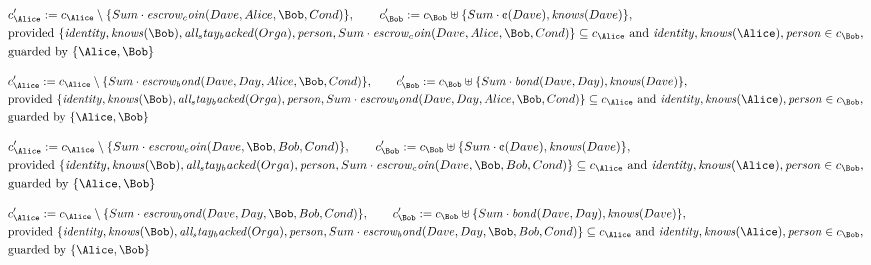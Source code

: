 \begin{align*}
&
c'_
{
\Alice
}
 := 
c_
{
\Alice
}
 \setminus 
\{
Sum
\cdot
\mathit{
escrow_coin
}
(
Dave
,
Alice
,
\Bob
,
Cond
)
\}
, \qquad 
c'_
{
\Bob
}
 := 
c_
{
\Bob
}
 \uplus 
\{
Sum
\cdot
\text{\textcent}
(
Dave
)
,
\mathit{
knows
}
(
Dave
)
\}
,\\
&
\text{provided } 
\{
\mathit{
identity
}
,
\mathit{
knows
}
(
\Bob
)
,
\mathit{
all_stay_backed
}
(
Orga
)
,
\mathit{
person
}
,
Sum
\cdot
\mathit{
escrow_coin
}
(
Dave
,
Alice
,
\Bob
,
Cond
)
\}
 \subseteq c_
{
\Alice
}
 \text{ and } 
\mathit{
identity
}
,
\mathit{
knows
}
(
\Alice
)
,
\mathit{
person
}
 \in c_
{
\Bob
}
,\\
&
\text{guarded by } \{
\Alice
,
\Bob
\}
\end{align*}

\begin{align*}
&
c'_
{
\Alice
}
 := 
c_
{
\Alice
}
 \setminus 
\{
Sum
\cdot
\mathit{
escrow_bond
}
(
Dave
,
Day
,
Alice
,
\Bob
,
Cond
)
\}
, \qquad 
c'_
{
\Bob
}
 := 
c_
{
\Bob
}
 \uplus 
\{
Sum
\cdot
\mathit{
bond
}
(
Dave
,
Day
)
,
\mathit{
knows
}
(
Dave
)
\}
,\\
&
\text{provided } 
\{
\mathit{
identity
}
,
\mathit{
knows
}
(
\Bob
)
,
\mathit{
all_stay_backed
}
(
Orga
)
,
\mathit{
person
}
,
Sum
\cdot
\mathit{
escrow_bond
}
(
Dave
,
Day
,
Alice
,
\Bob
,
Cond
)
\}
 \subseteq c_
{
\Alice
}
 \text{ and } 
\mathit{
identity
}
,
\mathit{
knows
}
(
\Alice
)
,
\mathit{
person
}
 \in c_
{
\Bob
}
,\\
&
\text{guarded by } \{
\Alice
,
\Bob
\}
\end{align*}

\begin{align*}
&
c'_
{
\Alice
}
 := 
c_
{
\Alice
}
 \setminus 
\{
Sum
\cdot
\mathit{
escrow_coin
}
(
Dave
,
\Bob
,
Bob
,
Cond
)
\}
, \qquad 
c'_
{
\Bob
}
 := 
c_
{
\Bob
}
 \uplus 
\{
Sum
\cdot
\text{\textcent}
(
Dave
)
,
\mathit{
knows
}
(
Dave
)
\}
,\\
&
\text{provided } 
\{
\mathit{
identity
}
,
\mathit{
knows
}
(
\Bob
)
,
\mathit{
all_stay_backed
}
(
Orga
)
,
\mathit{
person
}
,
Sum
\cdot
\mathit{
escrow_coin
}
(
Dave
,
\Bob
,
Bob
,
Cond
)
\}
 \subseteq c_
{
\Alice
}
 \text{ and } 
\mathit{
identity
}
,
\mathit{
knows
}
(
\Alice
)
,
\mathit{
person
}
 \in c_
{
\Bob
}
,\\
&
\text{guarded by } \{
\Alice
,
\Bob
\}
\end{align*}

\begin{align*}
&
c'_
{
\Alice
}
 := 
c_
{
\Alice
}
 \setminus 
\{
Sum
\cdot
\mathit{
escrow_bond
}
(
Dave
,
Day
,
\Bob
,
Bob
,
Cond
)
\}
, \qquad 
c'_
{
\Bob
}
 := 
c_
{
\Bob
}
 \uplus 
\{
Sum
\cdot
\mathit{
bond
}
(
Dave
,
Day
)
,
\mathit{
knows
}
(
Dave
)
\}
,\\
&
\text{provided } 
\{
\mathit{
identity
}
,
\mathit{
knows
}
(
\Bob
)
,
\mathit{
all_stay_backed
}
(
Orga
)
,
\mathit{
person
}
,
Sum
\cdot
\mathit{
escrow_bond
}
(
Dave
,
Day
,
\Bob
,
Bob
,
Cond
)
\}
 \subseteq c_
{
\Alice
}
 \text{ and } 
\mathit{
identity
}
,
\mathit{
knows
}
(
\Alice
)
,
\mathit{
person
}
 \in c_
{
\Bob
}
,\\
&
\text{guarded by } \{
\Alice
,
\Bob
\}
\end{align*}
